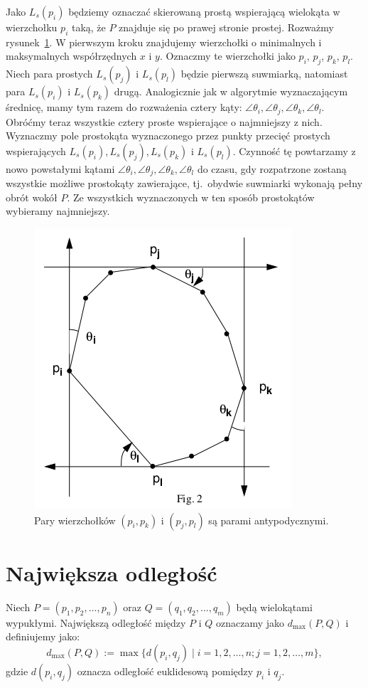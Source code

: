 Jako $L_s(p_i)$ będziemy oznaczać skierowaną prostą wspierającą
wielokąta w wierzchołku $p_i$ taką, że $P$ znajduje się po prawej
stronie prostej. Rozważmy rysunek~\ref{img:calipers2}. W pierwszym
kroku znajdujemy wierzchołki o minimalnych i maksymalnych
współrzędnych $x$ i $y$. Oznaczmy te wierzchołki jako $p_i$, $p_j$,
$p_k$, $p_l$. Niech para prostych $L_s(p_j)$ i $L_s(p_l)$ będzie
pierwszą suwmiarką, natomiast para $L_s(p_i)$ i $L_s(p_k)$
drugą. Analogicznie jak w algorytmie wyznaczającym średnicę, mamy tym
razem do rozważenia cztery kąty: $\angle{\theta_i}, \angle{\theta_j},
\angle{\theta_k}, \angle{\theta_l}$. Obróćmy teraz wszystkie cztery
proste wspierające o najmniejszy z nich. Wyznaczmy pole prostokąta
wyznaczonego przez punkty przecięć prostych wspierających $L_s(p_i),
L_s(p_j), L_s(p_k)$ i $L_s(p_l)$. Czynność tę powtarzamy z nowo
powstałymi kątami $\angle{\theta_i}, \angle{\theta_j},
\angle{\theta_k}, \angle{\theta_l}$ do czasu, gdy rozpatrzone zostaną
wszystkie możliwe prostokąty zawierające, tj.\ obydwie suwmiarki
wykonają pełny obrót wokół $P$. Ze wszystkich wyznaczonych w ten
sposób prostokątów wybieramy najmniejszy.

\begin{figure}[htb]
  \centering
  \includegraphics[scale=0.5]{img/calipers2}
  \caption{\label{img:calipers2} Pary wierzchołków $(p_i, p_k)$ i
    $(p_j, p_l)$ są parami antypodycznymi.}
\end{figure}

\section{Największa odległość\label{sec:max_dist}}
\begin{problem}
  Niech $P = (p_1, p_2, \ldots, p_n)$ oraz $Q = (q_1, q_2, \ldots,
  q_m)$ będą wielokątami wypukłymi. Największą odległość między $P$ i
  $Q$ oznaczamy jako $d_{\max}(P, Q)$ i definiujemy
  jako: $$d_{\max}(P, Q) := \max{\{ d(p_i, q_j) \mid i = 1, 2, \ldots,
    n; j = 1, 2, \ldots, m \}},$$ gdzie $d(p_i, q_j)$ oznacza
  odległość euklidesową pomiędzy $p_i$ i $q_j$.
\end{problem}

